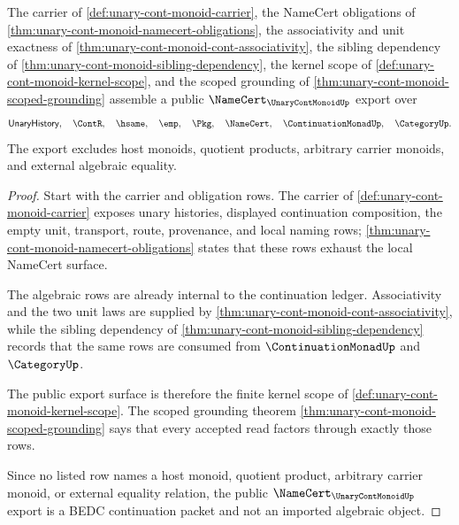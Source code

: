 \begin{theorem}
\label{thm:unary-cont-monoid-public-namecert-export}
The carrier of \autoref{def:unary-cont-monoid-carrier}, the NameCert obligations of \autoref{thm:unary-cont-monoid-namecert-obligations}, the associativity and unit exactness of \autoref{thm:unary-cont-monoid-cont-associativity}, the sibling dependency of \autoref{thm:unary-cont-monoid-sibling-dependency}, the kernel scope of \autoref{def:unary-cont-monoid-kernel-scope}, and the scoped grounding of \autoref{thm:unary-cont-monoid-scoped-grounding} assemble a public $\NameCert_{\UnaryContMonoidUp}$ export over
$$
\mathsf{UnaryHistory},\quad \ContR,\quad \hsame,\quad \emp,\quad \Pkg,\quad \NameCert,\quad \ContinuationMonadUp,\quad \CategoryUp .
$$
The export excludes host monoids, quotient products, arbitrary carrier monoids, and external algebraic equality.
\end{theorem}
\begin{proof}
Start with the carrier and obligation rows. The carrier of \autoref{def:unary-cont-monoid-carrier} exposes unary histories, displayed continuation composition, the empty unit, transport, route, provenance, and local naming rows; \autoref{thm:unary-cont-monoid-namecert-obligations} states that these rows exhaust the local NameCert surface.

The algebraic rows are already internal to the continuation ledger. Associativity and the two unit laws are supplied by \autoref{thm:unary-cont-monoid-cont-associativity}, while the sibling dependency of \autoref{thm:unary-cont-monoid-sibling-dependency} records that the same rows are consumed from $\ContinuationMonadUp$ and $\CategoryUp$.

The public export surface is therefore the finite kernel scope of \autoref{def:unary-cont-monoid-kernel-scope}. The scoped grounding theorem \autoref{thm:unary-cont-monoid-scoped-grounding} says that every accepted read factors through exactly those rows.

Since no listed row names a host monoid, quotient product, arbitrary carrier monoid, or external equality relation, the public $\NameCert_{\UnaryContMonoidUp}$ export is a BEDC continuation packet and not an imported algebraic object.
\end{proof}

